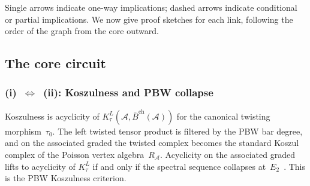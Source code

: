 \documentclass[11pt,reqno]{amsart}
\theoremstyle{definition}
\theoremstyle{remark}
\newcommand{\cA}{\mathcal{A}}
\newcommand{\barBch}{\bar{B}^{\mathrm{ch}}}
\newcommand{\Etwo}{E_2}
\numberwithin{equation}{section}
\begin{document}
\begin{center}
\end{center}

\noindent
Single arrows indicate one-way implications; dashed arrows indicate
conditional or partial implications.
We now give proof sketches for each link, following the order
of the graph from the core outward.

\subsection{The core circuit}

\subsubsection*{\textup{(i)}~$\Leftrightarrow$~\textup{(ii):}
Koszulness and PBW collapse}

Koszulness is acyclicity of $K_\tau^L(\cA, \barBch(\cA))$
for the canonical twisting morphism~$\tau_0$. The left
twisted tensor product is filtered by the PBW bar degree, and on
the associated graded the twisted complex becomes the standard
Koszul complex of the Poisson vertex algebra~$R_\cA$.
Acyclicity on the associated graded lifts to acyclicity of
$K_\tau^L$ if and only if the spectral sequence collapses
at~$\Etwo$~\cite[Thm.~4.2.1]{LorgatMKD1}. This is the PBW
Koszulness criterion.
\end{document}
